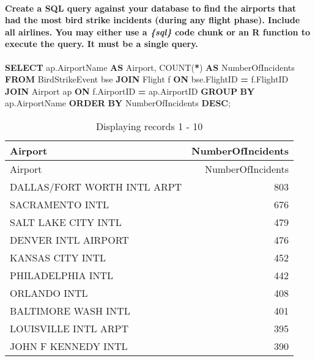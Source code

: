 \documentclass[
]{article}
\newenvironment{Shaded}{\begin{snugshade}}{\end{snugshade}}
\newcommand{\FunctionTok}[1]{\textcolor[rgb]{0.00,0.00,0.00}{#1}}
\newcommand{\KeywordTok}[1]{\textcolor[rgb]{0.13,0.29,0.53}{\textbf{#1}}}
\newcommand{\NormalTok}[1]{#1}
\newcommand{\OperatorTok}[1]{\textcolor[rgb]{0.81,0.36,0.00}{\textbf{#1}}}
\begin{document}
\hypertarget{create-a-sql-query-against-your-database-to-find-the-airports-that-had-the-most-bird-strike-incidents-during-any-flight-phase.-include-all-airlines.-you-may-either-use-a-sql-code-chunk-or-an-r-function-to-execute-the-query.-it-must-be-a-single-query.}{%
\paragraph{\texorpdfstring{Create a SQL query against your database to
find the airports that had the most bird strike incidents (during any
flight phase). Include all airlines. You may either use a \emph{\{sql\}}
code chunk or an R function to execute the query. It must be a single
query.}{Create a SQL query against your database to find the airports that had the most bird strike incidents (during any flight phase). Include all airlines. You may either use a \{sql\} code chunk or an R function to execute the query. It must be a single query.}}\label{create-a-sql-query-against-your-database-to-find-the-airports-that-had-the-most-bird-strike-incidents-during-any-flight-phase.-include-all-airlines.-you-may-either-use-a-sql-code-chunk-or-an-r-function-to-execute-the-query.-it-must-be-a-single-query.}}

\begin{Shaded}
\begin{Highlighting}[]
\KeywordTok{SELECT} 
\NormalTok{    ap.AirportName }\KeywordTok{AS}\NormalTok{ Airport,}
    \FunctionTok{COUNT}\NormalTok{(}\OperatorTok{*}\NormalTok{) }\KeywordTok{AS}\NormalTok{ NumberOfIncidents}
\KeywordTok{FROM} 
\NormalTok{    BirdStrikeEvent bse}
\KeywordTok{JOIN} 
\NormalTok{    Flight f }\KeywordTok{ON}\NormalTok{ bse.FlightID }\OperatorTok{=}\NormalTok{ f.FlightID}
\KeywordTok{JOIN} 
\NormalTok{    Airport ap }\KeywordTok{ON}\NormalTok{ f.AirportID }\OperatorTok{=}\NormalTok{ ap.AirportID}
\KeywordTok{GROUP} \KeywordTok{BY} 
\NormalTok{    ap.AirportName}
\KeywordTok{ORDER} \KeywordTok{BY} 
\NormalTok{    NumberOfIncidents }\KeywordTok{DESC}\NormalTok{;}
\end{Highlighting}
\end{Shaded}

\begin{longtable}[]{@{}lr@{}}
\caption{Displaying records 1 - 10}\tabularnewline
\toprule()
Airport & NumberOfIncidents \\
\midrule()
\endfirsthead
\toprule()
Airport & NumberOfIncidents \\
\midrule()
\endhead
DALLAS/FORT WORTH INTL ARPT & 803 \\
SACRAMENTO INTL & 676 \\
SALT LAKE CITY INTL & 479 \\
DENVER INTL AIRPORT & 476 \\
KANSAS CITY INTL & 452 \\
PHILADELPHIA INTL & 442 \\
ORLANDO INTL & 408 \\
BALTIMORE WASH INTL & 401 \\
LOUISVILLE INTL ARPT & 395 \\
JOHN F KENNEDY INTL & 390 \\
\bottomrule()
\end{longtable}
\end{document}
